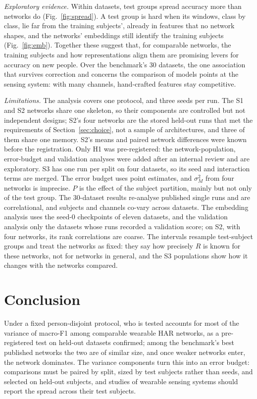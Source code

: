 \documentclass{IEEE_lsens}
\begin{document}
\emph{Exploratory evidence.} Within datasets, test groups spread accuracy more than networks do
(Fig.~\ref{fig:spread}). A test group is hard when its windows, class by class, lie far from the training subjects',
already in features that no network shapes, and the networks' embeddings still identify the training subjects
(Fig.~\ref{fig:emb}). Together these suggest that, for comparable networks, the training subjects and how
representations align them are promising levers for accuracy on new people. Over the benchmark's 30 datasets, the one
association that survives correction and concerns the comparison of models points at the sensing system: with many
channels, hand-crafted features stay competitive.

\emph{Limitations.} The analysis covers one protocol, and three seeds per run. The S1 and S2 networks share one
skeleton, so their components are controlled but not independent designs; S2's four networks are the stored
held-out runs that met the requirements of Section~\ref{sec:choice}, not a sample of architectures, and three of
them share one memory. S2's means and paired network differences
were known before the registration. Only H1 was pre-registered: the network-population, error-budget and validation
analyses were added after an internal review and are exploratory. S3 has one run per split on four datasets, so its
seed and interaction terms are merged. The error budget uses point estimates, and $\sigma^2_M$ from four networks is
imprecise. $P$ is the effect of the subject partition, mainly but not only of the test group. The 30-dataset results
re-analyse published single runs and are correlational, and subjects and channels co-vary across datasets. The
embedding analysis uses the seed-0 checkpoints of eleven datasets, and the validation analysis only the datasets whose
runs recorded a validation score; on S2, with four networks, its rank correlations are coarse. The intervals resample
test-subject groups and treat the networks as fixed: they say how precisely $R$ is known for these networks, not for
networks in general, and the S3 populations show how it changes with the networks compared.

\section{Conclusion}
Under a fixed person-disjoint protocol, who is tested accounts for most of the variance of macro-F1 among comparable
wearable HAR networks, as a pre-registered test on held-out datasets confirmed; among the benchmark's best published
networks the two are of similar size, and once weaker networks enter, the network dominates. The variance components
turn this into an error budget: comparisons must be paired by split, sized by test subjects rather than seeds, and
selected on held-out subjects, and studies of wearable sensing systems should report the spread across their test
subjects.



\end{document}
